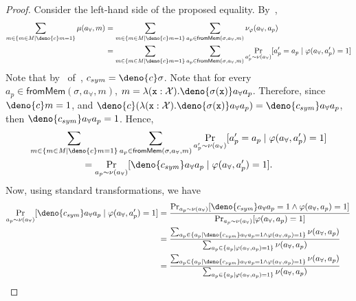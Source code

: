\documentclass[acmsmall,review,anonymous]{acmart}\settopmatter{printfolios=true,printccs=false,printacmref=false}
\begin{document}
\begin{proof}
  Consider the left-hand side of the proposed equality. By~,
  \begin{align*}
    \sum_{m \in \{m \in \mathit{M} \mid \deno{c}m = 1\}}\mu(a_{\forall},m) &= \sum_{m \in \{m \in \mathit{M} \mid \deno{c}m = 1\}} \sum_{a_p \in \mathsf{fromMem}(\sigma,a_{\forall},m)} \nu_{\varphi}(a_{\forall},a_p)\\
                                                         &= \sum_{m \in \{m \in \mathit{M} \mid \deno{c}m = 1\}} \sum_{a_p \in \mathsf{fromMem}(\sigma,a_{\forall},m)} \Pr_{a_p' \sim \nu(a_{\forall})}[a_p' = a_p \mid \varphi(a_{\forall},a_p') = 1] 
  \end{align*}
  Note that by~ of~, $c_{sym} = \deno{c} \sigma$. Note that for every $a_p \in \mathsf{fromMem}(\sigma,a_{\forall},m)$, $m = \lambda(\mathtt{x} : \mathcal{X}) . \deno{\sigma(\mathtt{x})} a_{\forall} a_p$. Therefore, since $\deno{c} m = 1$, and $\deno{c} (\lambda(\mathtt{x} : \mathcal{X}) . \deno{\sigma(\mathtt{x})} a_{\forall} a_p) = \deno{c_{sym}} a_{\forall} a_p$,
  then $\deno{c_{sym}} a_{\forall} a_p = 1$. Hence,
  \begin{multline*}
    \sum_{m \in \{m \in \mathit{M} \mid \deno{c}m = 1\}} \sum_{a_p \in \mathsf{fromMem}(\sigma,a_{\forall},m)} \Pr_{a_p' \sim \nu(a_{\forall})}[a_p' = a_p \mid \varphi(a_{\forall},a_p') = 1]\\
    = \Pr_{a_p \sim \nu(a_{\forall})}[\deno{c_{sym}} a_{\forall} a_p \mid \varphi(a_{\forall},a_p') = 1].
  \end{multline*}
  Now, using standard transformations, we have
  \begin{align*}
    \Pr_{a_p \sim \nu(a_{\forall})}[\deno{c_{sym}} a_{\forall} a_p \mid \varphi(a_{\forall},a_p') = 1] &= \frac{\Pr_{a_p \sim \nu(a_{\forall})}[\deno{c_{sym}} a_{\forall} a_p = 1 \wedge \varphi(a_{\forall},a_p) = 1]}{\Pr_{a_p \sim \nu(a_{\forall})}[\varphi(a_{\forall},a_p) = 1]}\\
                                                                       &= \frac{\sum_{a_p \in \{a_p \mid \deno{c_{sym}} a_{\forall} a_p = 1 \wedge \varphi(a_{\forall},a_p) = 1\}}\nu(a_{\forall},a_p)}{\sum_{a_p \in \{a_p \mid \varphi(a_{\forall},a_p) = 1\}}\nu(a_{\forall},a_p)}\\
                                                                       &= \frac{\sum_{a_p \in \{a_p \mid \deno{c_{sym}} a_{\forall} a_p = 1 \wedge \varphi(a_{\forall},a_p) = 1\}}\nu(a_{\forall},a_p)}{\sum_{a_p \in \{a_p \mid \varphi(a_{\forall},a_p) = 1\}}\nu(a_{\forall},a_p)}

\end{align*}
\end{proof}
\end{document}
